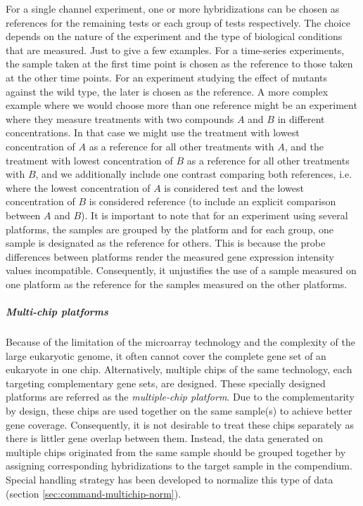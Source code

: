 For a single channel experiment, one or more hybridizations can be chosen as references for the remaining tests or each group of tests respectively. The choice depends on the nature of the experiment and the type of biological conditions that are measured. Just to give a few examples.  For a time-series experiments, the sample taken at the first time point is chosen as the reference to those taken at the other time points.  For an experiment studying the effect of mutants against the wild type, the later is chosen as the reference. A more complex example where we would choose more than one reference might be an experiment where they measure treatments with two compounds $A$ and $B$ in different concentrations. In that case we might use the treatment with lowest concentration of $A$ as a reference for all other treatments with $A$, and the treatment with lowest concentration of $B$ as a reference for all other treatments with $B$, and we additionally include one contrast comparing both references, i.e. where the lowest concentration of $A$ is considered test and the lowest concentration of $B$ is considered reference (to include an explicit comparison between $A$ and $B$). It is important to note that for an experiment using several platforms, the samples are grouped by the platform and for each group, one sample is designated as the reference for others.  This is because the probe differences between platforms render the measured gene expression intensity values incompatible.  Consequently, it unjustifies the use of a sample measured on one platform as the reference for the samples measured on the other platforms.  

\subparagraph{Multi-chip platforms}\label{sec:command-multichip-anno}
Because of the limitation of the microarray technology and the complexity of the large eukaryotic genome, it often cannot cover the complete gene set of an eukaryote in one chip. Alternatively, multiple chips of the same technology, each targeting complementary gene sets, are designed. These specially designed platforms are referred as the \textit{multiple-chip   platform}. Due to the complementarity by design, these chips are used together on the same sample(s) to achieve better gene coverage. Consequently, it is not desirable to treat these chips separately as there is littler gene overlap between them. Instead, the data generated on multiple chips originated from the same sample should be grouped together by assigning corresponding hybridizations to the target sample in the compendium. Special handling strategy has been developed to normalize this type of data (section \ref{sec:command-multichip-norm}). 


